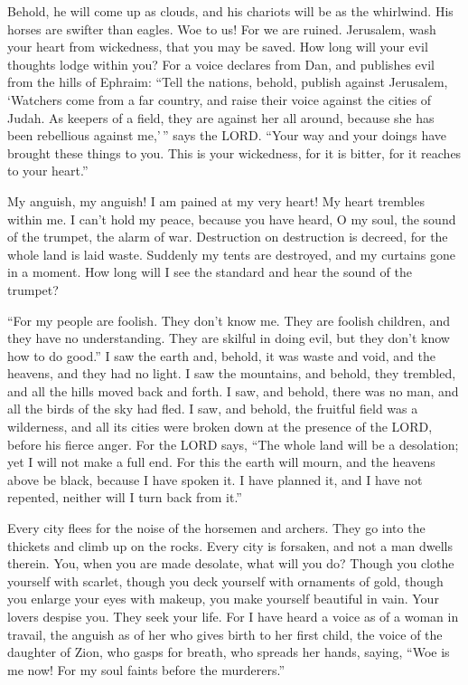  Behold, he will come up as clouds, and his chariots will
be as the whirlwind. His horses are swifter than eagles. Woe to us! For
we are ruined.  Jerusalem, wash your heart from
wickedness, that you may be saved. How long will your evil thoughts
lodge within you?  For a voice declares from Dan, and
publishes evil from the hills of Ephraim:  ``Tell the
nations, behold, publish against Jerusalem, `Watchers come from a far
country, and raise their voice against the cities of Judah.
 As keepers of a field, they are against her all around,
because she has been rebellious against me,'\,'' says the LORD.
 ``Your way and your doings have brought these things to
you. This is your wickedness, for it is bitter, for it reaches to your
heart.''

 My anguish, my anguish! I am pained at my very heart! My
heart trembles within me. I can't hold my peace, because you have heard,
O my soul, the sound of the trumpet, the alarm of war. 
Destruction on destruction is decreed, for the whole land is laid waste.
Suddenly my tents are destroyed, and my curtains gone in a moment.
 How long will I see the standard and hear the sound of
the trumpet?

 ``For my people are foolish. They don't know me. They
are foolish children, and they have no understanding. They are skilful
in doing evil, but they don't know how to do good.''  I
saw the earth and, behold, it was waste and void, and the heavens, and
they had no light.  I saw the mountains, and behold, they
trembled, and all the hills moved back and forth.  I saw,
and behold, there was no man, and all the birds of the sky had fled.
 I saw, and behold, the fruitful field was a wilderness,
and all its cities were broken down at the presence of the LORD, before
his fierce anger.  For the LORD says, ``The whole land
will be a desolation; yet I will not make a full end. 
For this the earth will mourn, and the heavens above be black, because I
have spoken it. I have planned it, and I have not repented, neither will
I turn back from it.''

 Every city flees for the noise of the horsemen and
archers. They go into the thickets and climb up on the rocks. Every city
is forsaken, and not a man dwells therein.  You, when you
are made desolate, what will you do? Though you clothe yourself with
scarlet, though you deck yourself with ornaments of gold, though you
enlarge your eyes with makeup, you make yourself beautiful in vain. Your
lovers despise you. They seek your life.  For I have
heard a voice as of a woman in travail, the anguish as of her who gives
birth to her first child, the voice of the daughter of Zion, who gasps
for breath, who spreads her hands, saying, ``Woe is me now! For my soul
faints before the murderers.''

